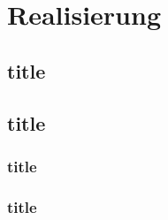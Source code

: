 \chapter{Realisierung}
	\section{title}
		\blindtext
		
		\blindtext
		\blindtext
		
	\section{title}
		\blindtext
		
		\blindtext
		
		\blindtext

		\subsection{title}
			\blindtext
			
			\blindtext
		\subsection{title}
			\blindtext
		
		
		
		